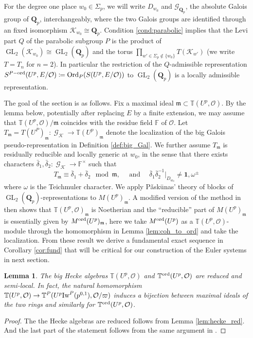 \documentclass[leqno]{amsart}
\newtheorem{lem}[thm]{Lemma}
\theoremstyle{definition}
\theoremstyle{remark}
\newcommand{\id}{\mathbf{1}}
\newcommand{\oo}{\mathcal{O}}
\newcommand{\fF}{\mathbb{F}} %
\newcommand{\Qp}{\mathbf{Q}_p}
\DeclareMathOperator{\GL}{GL}
\DeclareMathOperator{\Gal}{\mathcal{G}}
\newcommand{\fm}{\mathfrak{m}}
\DeclareMathOperator{\Ord}{Ord} %
\newcommand{\Gp}{\mathcal{G}_{\Qp}} %
\newcommand{\K}{{\mathcal{K}}} %
\newcommand{\Iw}{\textnormal{Iw}} %
\newcommand{\TT}{\mathbb{T}} %
\newcommand{\ord}{\textnormal{ord}} %
\begin{document}
For the degree one place $w_0\in \Sigma_p$,
we will write $D_{w_0}$ and $\Gp$,
the absolute Galois group of  $\Qp$, interchangeably,
where the two Galois groups are identified 
through an fixed isomorphism $\K_{w_0}\cong \Qp$.
Condition \eqref{cond:parabolic}
implies that the Levi part $Q$
of the parabolic subgroup $P$
is the product of $\GL_2(\K_{w_0})\cong \GL_2(\Qp)$
and the torus $\prod_{w'\in\Sigma_p\notin\{w_0\}}T(\K_{w'})$
(we write $T=T_n$ for $n=2$).
In particular the restriction of the $Q$-admissible representation
$S^{P-\ord}(U^p,E/\oo)\coloneqq \Ord_P(S(U^p,E/\oo))$
to $\GL_2(\Qp)$
is a locally admissible representation.

The goal of the section is as follows.
Fix a maximal ideal $\fm\subset \TT(U^p,\oo)$.
By the lemma below,
potentially after replacing $E$ by a finite extension,
we may assume that 
$\TT(U^p,\oo)/\fm$ coincides with the residue field $\fF$ of $\oo$.
Let $T_{\fm}=T(U^P)_{\fm}\colon \Gal_\K\to \TT(U^p)_{\fm}$
denote the localization of 
the big Galois pseudo-representation in 
Definition \ref{def:big_Gal}.
We further assume  $T_{\fm}$ is 
residually reducible and locally generic at $w_0$,
in the sense that there exists characters
$\bar{\delta}_1, \bar{\delta}_2\colon \Gal_{\K}\to \fF^\times$
such that 
\begin{equation}\tag{red.gen}\label{cond:red_gen}
	T_\fm\equiv \bar{\delta}_1+\bar{\delta}_2
	\mod \fm,\quad
    \text{ and }\quad
	\bar{\delta}_1\bar{\delta}_2^{-1} \vert_{D_{w_0}}
	\neq \id,\omega^{\pm}
\end{equation}
where $\omega$ is the Teichmuler character.
We apply P\v{a}sk\={u}nas' theory of blocks
of $\GL_2(\Qp)$-representations
to $M(U^p)_{\fm}$.
A modified version of the method in \cite{urban}
then shows that $\TT(U^p,\oo)_{\fm}$ is Noetherian
and the ``reducible'' part of  $M(U^p)_{\fm}$
is essentially given by $M^{\ord}(U^p)_{\fm}$,
here we take $M^{\ord}(U^p)$
as a $\TT(U^p,\oo)$-module 
through the homomorphism in Lemma \ref{lem:coh_to_ord}
and take the localization.
From these result we derive a fundamental exact sequence
in Corollary \ref{cor:fund} that will be critical
for our construction of the Euler systems in next section.


\begin{lem}\label{lem:big_red}
The big Hecke algebras 
$\TT(U^p,\oo)$ and $\TT^{\ord}(U^p,\oo)$
are reduced and semi-local.
In fact, the natural homomorphism
$\TT(U^p,\oo)\to \TT^P(U^p\Iw^P(p^{0,1}),\oo/\varpi)$ 
induces a bijection between maximal ideals of the two rings
and similarly for $\TT^{\ord}(U^p,\oo)$.
\end{lem}
\begin{proof}
The the Hecke algebras are reduced
follows from Lemma \ref{lem:hecke_red}.
And the last part of the statement
follows from the same argument
in \cite[Prop 3.3.6]{pan}.
\end{proof}
\end{document}

